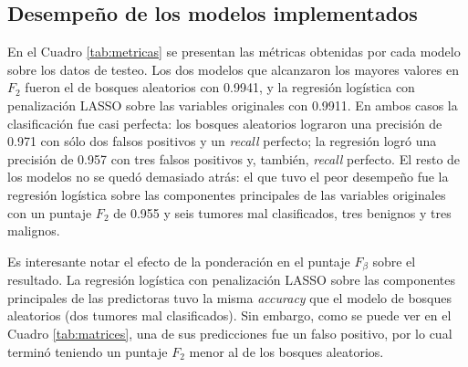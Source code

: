 %

\subsection{Desempeño de los modelos implementados}


\begin{table}[h]

\caption{Métricas de los modelos en los datos de testeo. Se presentan en orden descendiente según el puntaje $F_2$ obtenido en el conjunto de testeo.}
\label{tab:metricas}
\end{table}

En el Cuadro \ref{tab:metricas} se presentan las métricas obtenidas por cada
modelo sobre los datos de testeo. Los dos modelos que alcanzaron los mayores
valores en $F_2$ fueron el de bosques aleatorios con 0.9941, y la regresión
logística con penalización LASSO sobre las variables originales con 0.9911. En
ambos casos la clasificación fue casi perfecta: los bosques aleatorios lograron
una precisión de 0.971 con sólo dos falsos positivos y un \textit{recall}
perfecto; la regresión logró una precisión de 0.957 con tres falsos positivos
y, también, \textit{recall} perfecto. El resto de los modelos no se quedó
demasiado atrás: el que tuvo el peor desempeño fue la regresión logística sobre
las componentes principales de las variables originales con un puntaje
$F_2$ de 0.955 y seis tumores mal clasificados, tres benignos y tres malignos.

\begin{table}[h]

\caption{Matrices de confusión de los dos mejores modelos.}
\label{tab:matrices}
\end{table}

Es interesante notar el efecto de la ponderación en el puntaje $F_\beta$ sobre
el resultado. La regresión logística con penalización LASSO sobre las
componentes principales de las predictoras tuvo la misma \textit{accuracy} que
el modelo de bosques aleatorios (dos tumores mal clasificados). Sin embargo,
como se puede ver en el Cuadro \ref{tab:matrices}, una de sus predicciones fue
un falso positivo, por lo cual terminó teniendo un puntaje $F_2$ menor al de
los bosques aleatorios.


